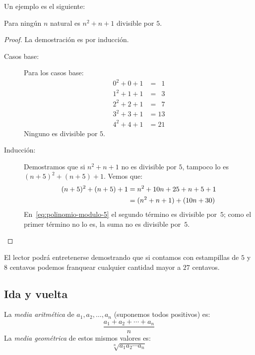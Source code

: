   Un ejemplo es el siguiente:
  \begin{proposition}
    Para ningún \(n\) natural es \(n^2 + n + 1\)
    divisible por \(5\).
  \end{proposition}
  \begin{proof}
    La demostración es por inducción.
    \begin{description}
    \item[Casos base:]
      Para los casos base:
      \begin{align*}
	0^2 + 0 + 1 &= \phantom{0}1 \\
	1^2 + 1 + 1 &= \phantom{0}3 \\
	2^2 + 2 + 1 &= \phantom{0}7 \\
	3^2 + 3 + 1 &=		 13 \\
	4^2 + 4 + 1 &=		 21
      \end{align*}
      Ninguno es divisible por \(5\).
    \item[Inducción:]
      Demostramos que si \(n^2 + n + 1\) no es divisible por \(5\),
      tampoco lo es \((n + 5)^2 + (n + 5) + 1\).
      Vemos que:
      \begin{align}
	(n + 5)^2 + (n + 5) + 1
	  &= n^2 + 10 n + 25 + n + 5 + 1 \notag \\
	  &= (n^2 + n + 1) + (10 n + 30)
	       \label{eq:polinomio-modulo-5}
      \end{align}
      En~\eqref{eq:polinomio-modulo-5}
      el segundo término es divisible por~\(5\);
      como el primer término no lo es,
      la suma no es divisible por~\(5\).
    \qedhere
    \end{description}
  \end{proof}
  El lector podrá entretenerse demostrando
  que si contamos con estampillas de \(5\) y \(8\) centavos
  podemos franquear cualquier cantidad mayor a \(27\) centavos.

\subsection{Ida y vuelta}
\label{sec:induccion-ida-y-vuelta}

  La \emph{media aritmética} de \(a_1, a_2, \dotsc, a_n\)%
  (suponemos todos positivos)
  es:
  \begin{equation*}
    \frac{a_1 + a_2 + \dotsb + a_n}{n}
  \end{equation*}
  La \emph{media geométrica} de estos mismos valores%
  es:
  \begin{equation*}
    \sqrt[n]{a_1 a_2 \dotsb a_n}
  \end{equation*}

